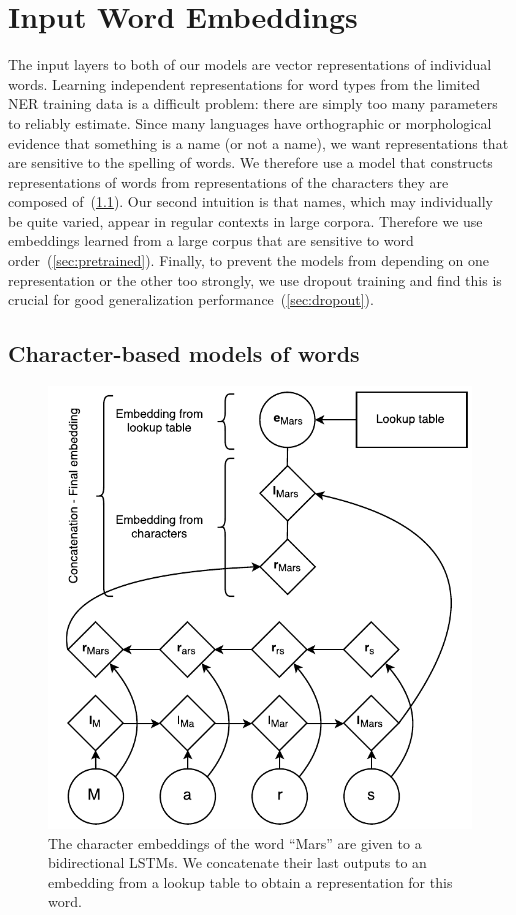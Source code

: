 \documentclass[11pt,letterpaper]{article}
\begin{document}
\section{Input Word Embeddings}\label{sec:words}
The input layers to both of our models are vector representations of individual words. Learning independent representations for word types from the limited NER training data is a difficult problem: there are simply too many parameters to reliably estimate. Since many languages have orthographic or morphological evidence that something is a name (or not a name), we want representations that are sensitive to the spelling of words. We therefore use a model that constructs representations of words from representations of the characters they are composed of~(\ref{sec:character-model}). Our second intuition is that names, which may individually be quite varied, appear in regular contexts in large corpora. Therefore we use embeddings learned from a large corpus that are sensitive to word order~(\ref{sec:pretrained}). Finally, to prevent the models from depending on one representation or the other too strongly, we use dropout training and find this is crucial for good generalization performance~(\ref{sec:dropout}).

\subsection{Character-based models of words}
\label{sec:character-model}


\begin{figure}
  \centering
    \includegraphics[scale=0.68]{char-model4}
  \caption{The character embeddings of the word ``Mars'' are given to a bidirectional LSTMs. We concatenate their last outputs to an embedding from a lookup table to obtain a representation for this word.}
  \label{fig:char-model}
\end{figure}
\end{document}

